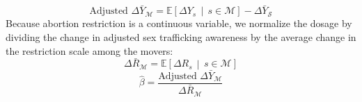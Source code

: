 \begin{equation}
\text{Adjusted } \Delta \bar{Y}_{\mathcal{M}} 
= \mathbb{E}\left[\Delta Y_s \,\middle|\, s \in \mathcal{M}\right]
- \Delta \bar{Y}_{\mathcal{S}}
\end{equation}
Because abortion restriction is a continuous variable, we normalize the dosage by dividing the change in adjusted sex trafficking awareness by the average change in the restriction scale among the movers:
\begin{equation}
\Delta \bar{R}_{\mathcal{M}} = \mathbb{E}\left[\Delta R_s \,\middle|\, s \in \mathcal{M}\right]
\end{equation}
\begin{equation}
\hat{\beta} = \frac{\text{Adjusted } \Delta \bar{Y}_{\mathcal{M}}}{\Delta \bar{R}_{\mathcal{M}}}
\end{equation}  
